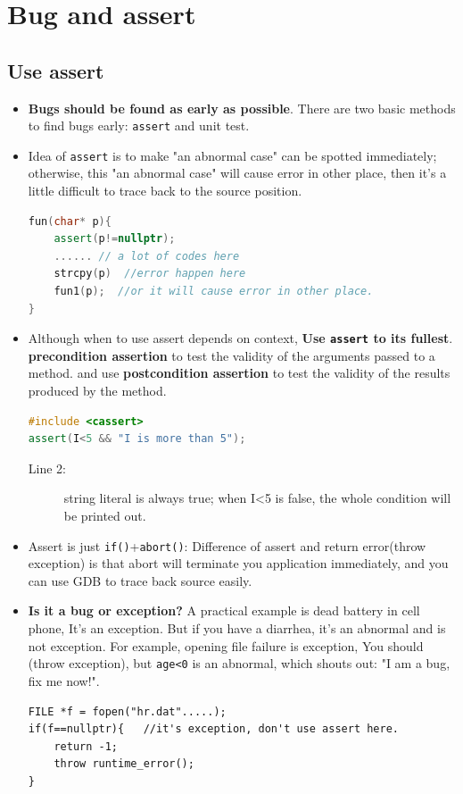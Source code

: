\documentclass[a4paper,11pt,twoside]{book}
\begin{document}
\section{Bug and assert}
\subsection{Use assert}

\begin{itemize}
	\item \textbf{Bugs should be found as early as possible}. There are two basic methods to find bugs early: \texttt{assert} and unit test.
	
	\item Idea of \texttt{assert} is to make "an abnormal case" can be spotted immediately; otherwise, this "an abnormal case" will cause error in other place, then it's a little difficult to trace back to the source position.
\begin{lstlisting}[frame=single, language=c++]
fun(char* p){
	assert(p!=nullptr);
	...... // a lot of codes here
	strcpy(p)  //error happen here
	fun1(p);  //or it will cause error in other place.
}
\end{lstlisting}
	
	\item Although when to use assert depends on context, \textbf{Use \texttt{assert} to its fullest}. \textbf{precondition assertion} to test the validity of the arguments passed to a method. and use \textbf{postcondition assertion} to test the validity of the results produced by the method. 

\begin{lstlisting}[frame=single, language=c++]
#include <cassert>
assert(I<5 && "I is more than 5");
\end{lstlisting}
\begin{description}
	\item[Line 2:] string literal is always true; when I<5 is false, the whole condition will be printed out.
\end{description}
	
	\item Assert is just \texttt{if()}+\texttt{abort()}: Difference of assert and return error(throw exception) is that abort will terminate you application immediately, and you can use GDB to trace back source easily.
	
	\item \textbf{Is it a bug or exception?} A practical example is dead battery in cell phone, It's an exception. But if you have a diarrhea, it's an abnormal and is not exception. For example, opening file failure is exception, You should (throw exception), but \texttt{age<0} is an abnormal, which shouts out: "I am a bug, fix me now!". 
\begin{lstlisting}[numbers=none]
FILE *f = fopen("hr.dat".....);
if(f==nullptr){   //it's exception, don't use assert here.
	return -1;
	throw runtime_error();
}
	

\end{lstlisting}
\end{itemize}
\end{document}
